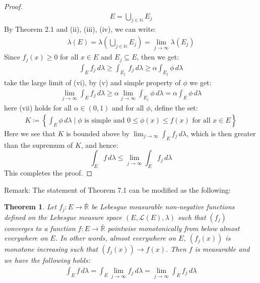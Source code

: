 \documentclass[11pt]{book}
\theoremstyle{break}
\theoremstyle{break}
\newtheorem{thm}{Theorem}[section]
\newcommand{\R}{\mathbb{R}}
\newcommand{\N}{\mathbb{N}}
\newcommand{\remark}{\color{blue}Remark: \color{black}}
\begin{document}
\begin{proof}
\begin{align*}
E = \bigcup_{j\in \N} E_j \tag{iv}
\end{align*}
By Theorem 2.1 and (ii), (iii), (iv), we can write:
\begin{align*}
\lambda(E) = \lambda\left(\bigcup_{j\in \N}E_j\right) = \lim_{j\to \infty}\lambda(E_j) \tag{v}
\end{align*}
Since $f_j (x) \geq 0$ for all $x \in E$ and $E_j \subseteq E$, then we get:
\begin{align*}
\int_E f_j\, d\lambda \geq \int_{E_j} \, f_j \, d\lambda \geq \alpha \int_{E_j}\phi\, d\lambda
\tag{vi}
\end{align*}
take the large limit of (vi), by (v) and simple property of $\phi$ we get:
\begin{align*}
\lim_{j\to \infty} \int_E f_j \, d\lambda \geq \alpha \lim_{j\to \infty}\int_{E_j}\phi\, d\lambda = \alpha \int_E \phi\, d\lambda \tag{vii}
\end{align*}
here (vii) holds for all $\alpha \in (0,1)$ and for all $\phi$, define the set:
\begin{align*}
K \coloneqq \left\{ \int_E \phi \, d\lambda \mid \phi \text{ is simple and }0\leq \phi(x) \leq f(x) \text{ for all }x\in E\right\}
\end{align*}
Here we see that $K$ is bounded above by $\lim_{j\to \infty}\int_E f_j \, d\lambda$, which is then greater than the supremum of $K$, and hence:
$$\int_E f\, d\lambda \leq \lim_{j\to \infty}\int_E f_j \, d\lambda$$
This completes the proof.
\end{proof}
\remark The statement of Theorem 7.1 can be modified as the following:\begin{thm}
Let $f_j: E \to \bar{\R}$ be Lebesgue measurable non-negative functions defined on the Lebesgue measure space $(E,\mathcal{L}(E), \lambda)$ such that $(f_j)$ converges to a function $f:E \to \bar{\R}$ pointwise monotonically from below almost everywhere on $E$. In other words, almost everywhere on $E$, $(f_j(x))$ is monotone increasing such that $(f_j(x)) \to f(x)$. Then $f$ is measurable and we have the following holds:
\begin{align*}
\int_E f\, d\lambda = \int_E \lim_{j\to \infty}f_j \, d\lambda = \lim_{j\to \infty}\int_E f_j \, d\lambda
\end{align*}
\end{thm}
\end{document}
